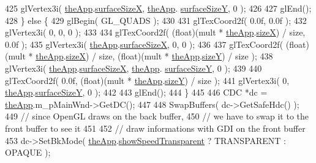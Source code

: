 \begin{DoxyCode}
425         glVertex3i( \mbox{\hyperlink{_v_b_a_8cpp_a8095a9d06b37a7efe3723f3218ad8fb3}{theApp}}.\mbox{\hyperlink{class_v_b_a_a14ab3c3ab83f07d70e2a40090e37deea}{surfaceSizeX}}, \mbox{\hyperlink{_v_b_a_8cpp_a8095a9d06b37a7efe3723f3218ad8fb3}{theApp}}.
      \mbox{\hyperlink{class_v_b_a_a63dc67ff3aa9347f32f583fee92cf609}{surfaceSizeY}}, 0 );
426 
427         glEnd();
428     \} \textcolor{keywordflow}{else} \{
429         glBegin( GL\_QUADS );
430 
431         glTexCoord2f( 0.0f, 0.0f );
432         glVertex3i( 0, 0, 0 );
433 
434         glTexCoord2f( (\textcolor{keywordtype}{float})(mult * \mbox{\hyperlink{_v_b_a_8cpp_a8095a9d06b37a7efe3723f3218ad8fb3}{theApp}}.\mbox{\hyperlink{class_v_b_a_a7b711f29fd088fa6611d240277a24e9e}{sizeX}}) / size, 0.0f );
435         glVertex3i( \mbox{\hyperlink{_v_b_a_8cpp_a8095a9d06b37a7efe3723f3218ad8fb3}{theApp}}.\mbox{\hyperlink{class_v_b_a_a14ab3c3ab83f07d70e2a40090e37deea}{surfaceSizeX}}, 0, 0 );
436 
437         glTexCoord2f( (\textcolor{keywordtype}{float})(mult * \mbox{\hyperlink{_v_b_a_8cpp_a8095a9d06b37a7efe3723f3218ad8fb3}{theApp}}.\mbox{\hyperlink{class_v_b_a_a7b711f29fd088fa6611d240277a24e9e}{sizeX}}) / size, (\textcolor{keywordtype}{float})(mult * 
      \mbox{\hyperlink{_v_b_a_8cpp_a8095a9d06b37a7efe3723f3218ad8fb3}{theApp}}.\mbox{\hyperlink{class_v_b_a_acb2e7221985fd0355f105cd1ec42e52e}{sizeY}}) / size );
438         glVertex3i( \mbox{\hyperlink{_v_b_a_8cpp_a8095a9d06b37a7efe3723f3218ad8fb3}{theApp}}.\mbox{\hyperlink{class_v_b_a_a14ab3c3ab83f07d70e2a40090e37deea}{surfaceSizeX}}, \mbox{\hyperlink{_v_b_a_8cpp_a8095a9d06b37a7efe3723f3218ad8fb3}{theApp}}.
      \mbox{\hyperlink{class_v_b_a_a63dc67ff3aa9347f32f583fee92cf609}{surfaceSizeY}}, 0 );
439 
440         glTexCoord2f( 0.0f, (\textcolor{keywordtype}{float})(mult * \mbox{\hyperlink{_v_b_a_8cpp_a8095a9d06b37a7efe3723f3218ad8fb3}{theApp}}.\mbox{\hyperlink{class_v_b_a_acb2e7221985fd0355f105cd1ec42e52e}{sizeY}}) / size );
441         glVertex3i( 0, \mbox{\hyperlink{_v_b_a_8cpp_a8095a9d06b37a7efe3723f3218ad8fb3}{theApp}}.\mbox{\hyperlink{class_v_b_a_a63dc67ff3aa9347f32f583fee92cf609}{surfaceSizeY}}, 0 );
442 
443         glEnd();
444     \}
445 
446     CDC *dc = \mbox{\hyperlink{_v_b_a_8cpp_a8095a9d06b37a7efe3723f3218ad8fb3}{theApp}}.m\_pMainWnd->GetDC();
447 
448     SwapBuffers( dc->GetSafeHdc() );
449     \textcolor{comment}{// since OpenGL draws on the back buffer,}
450     \textcolor{comment}{// we have to swap it to the front buffer to see it}
451     
452     \textcolor{comment}{// draw informations with GDI on the front buffer}
453     dc->SetBkMode( \mbox{\hyperlink{_v_b_a_8cpp_a8095a9d06b37a7efe3723f3218ad8fb3}{theApp}}.\mbox{\hyperlink{class_v_b_a_a0a2ca5a7091f9c79b39ea0916dd88a05}{showSpeedTransparent}} ? TRANSPARENT : OPAQUE );

\end{DoxyCode}
